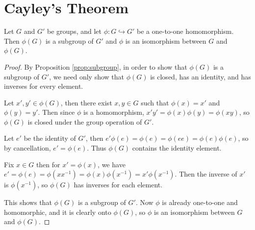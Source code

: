 \documentclass[10pt]{report}
\begin{document}

\section{Cayley's Theorem}

\begin{lem}
	Let $G$ and $G'$ be groups, and let $\phi:G \hookrightarrow  G'$ be a one-to-one homomorphism. Then $\phi(G)$ is a subgroup of $G'$ and $\phi$ is an isomorphism between $G$ and $\phi(G)$.
\end{lem}
\begin{proof}
	By Proposition \ref{prop:subgroup}, in order to show that $\phi(G)$ is a subgroup of $G'$, we need only show that $\phi(G)$ is closed, has an identity, and has inverses for every element.

	Let $x',y' \in \phi(G)$, then there exist $x,y\in G$ such that $\phi(x)=x'$ and $\phi(y)=y'$. Then since $\phi$ is a homomorphism, $x'y' = \phi(x)\phi(y) = \phi(xy)$, so $\phi(G)$ is closed under the group operation of $G'$.

	Let $e'$ be the identity of $G'$, then $e'\phi(e) = \phi(e) = \phi(ee) = \phi(e) \phi(e)$, so by cancellation, $e' = \phi(e)$. Thus $\phi(G)$ contains the identity element.

	Fix $x \in G$ then for $x'=\phi(x)$, we have $e'=\phi(e) = \phi(xx^{-1}) = \phi(x)\phi(x^{-1}) = x'\phi(x^{-1}).$ Then the inverse of $x'$ is $\phi(x^{-1})$, so $\phi(G)$ has inverses for each element.

	This shows that $\phi(G)$ is a subgroup of $G'$. Now $\phi$ is already one-to-one and homomorphic, and it is clearly onto $\phi(G)$, so $\phi$ is an isomorphism between $G$ and $\phi(G)$.
\end{proof}
\end{document}
